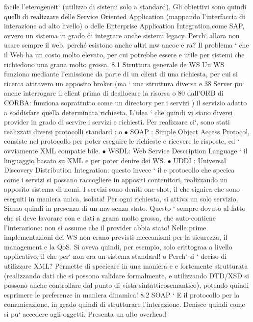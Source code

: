 \documentclass[a4paper,12pt]{article}
\begin{document}
facile l'eterogeneit` (utilizzo di sistemi solo
a
standard). Gli obiettivi sono quindi quelli di realizzare delle Service Oriented
Application (mappando l'interfaccia di interazione ad alto livello) o delle Enterprise Application Integration,come SAP,
ovvero un sistema in grado di integrare
anche sistemi legacy.
Perch` allora non usare sempre il web, perché esistono anche altri mw ancoe
e
ra? Il problema ` che il Web ha un costo molto elevato, per cui potrebbe essere
e
utile per sistemi che richiedono una grana molto grossa.
8.1
Struttura generale de WS
Un WS funziona mediante l'emissione da parte di un client di una richiesta,
per cui si ricerca attravero un apposito broker (ma ` una struttura diversa
e
38 Server
pu` anche interrogare il client prima di deallocare la risorsa
o
80
\newpage
dall'ORB di CORBA: funziona soprattutto come un directory per i servizi ) il
servizio adatto a soddisfare quella determinata richiesta.
L'idea ` che quindi vi siano diversi provider in grado di servire i servizi
e
richiesti. Per realizzare ci`, sono stati realizzati diversi protocolli standard :
o
$\bullet$ SOAP : Simple Object Access Protocol, consiste nel protocollo per poter
eseguire le richieste e ricevere le risposte, ed ` ovviamente XML compatie
bile.
$\bullet$ WSDL: Web Service Description Language ` il linguaggio basato su XML
e
per poter denire dei WS.
$\bullet$ UDDI : Universal Discovery Distribution Integration: questo invece ` il
e
protocollo che specica come i servizi si possano raccogliere in appositi
contenitori, realizzando un apposito sistema di nomi.
I servizi sono deniti one-shot, il che signica che sono eseguiti in maniera unica,
isolata! Per ogni richiesta, si attiva un solo servizio. Siamo quindi in presenza
di un mw senza stato. Questo ` sempre dovuto al fatto che si deve lavorare con
e
dati a grana molto grossa, che auto-contiene l'interazione: non si assume che il
provider abbia stato!
Nelle prime implementazioni dei WS non erano previsti meccanismi per la
sicurezza, il management e la QoS. Si aveva quindi, per esempio, solo crittograa
a livello applicativo, il che per` non era un sistema standard!
o
Perch` si ` deciso di utilizzare XML? Permette di specicare in una maniera
e e
fortemente strutturata (realizzando dati che si possono validare formalmente, e
utilizzando DTD/XSD si possono anche controllare dal punto di vista sintatticosemantico), potendo quindi esprimere le
preferenze in maniera dinamica!
8.2
SOAP
`
E il protocollo per la comunicazione, in grado quindi di strutturare l'interazione.
Denisce quindi come si pu` accedere agli oggetti. Presenta un alto overhead
\end{document}
